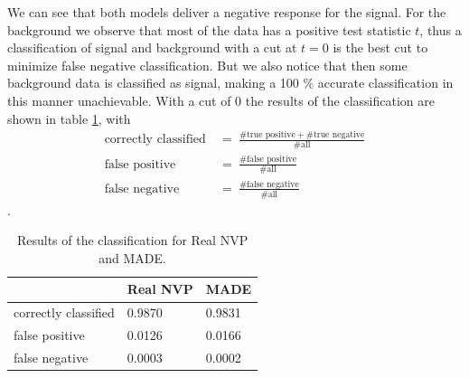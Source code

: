\documentclass[%
 reprint,
 amsmath,amssymb,
 aps,
]{revtex4-2}
\begin{document}
We can see that both models deliver a negative response for the signal. For the background we observe that most of the data has a positive test statistic $t$, thus a classification of signal and background with a cut at $t=0$ is the best cut to minimize false negative classification. But we also notice that then some background data is classified as signal, making a 100 \% accurate classification in this manner unachievable. With a cut of 0 the results of the classification are shown in table \ref{tab: res}, with  
\begin{align*}
\text{correctly classified}~&=~\frac{\# \text{true positive}+ \# \text{true negative}}{\# \text{all}}\\ \text{false positive}~&=~\frac{\# \text{false positive}}{\# \text{all}}\\
\text{false negative}~&=~\frac{\# \text{false negative}}{\# \text{all}}
\end{align*}
.
\begin{table}
	\centering
	\begin{tabular}{|l|l|l|}
		\hline
		& Real NVP& MADE \\
		\hline
		correctly classified & 0.9870  & 0.9831\\
		\hline
		false positive &0.0126 & 0.0166 \\
		\hline
		false negative &0.0003 & 0.0002\\
		\hline
	\end{tabular}
	\caption{Results of the classification for Real NVP and MADE. \label{tab: res}}
\end{table}
\end{document}
